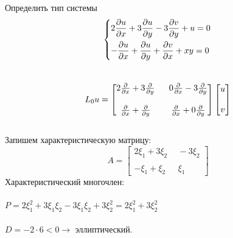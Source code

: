 \documentclass[../main.tex]{subfiles}
\begin{document}
\begin{example}
	Определить тип системы
	$$
		\begin{dcases}
			2\frac{\partial u}{\partial x} + 3\frac{\partial u}{\partial y}-3\frac{\partial v}{\partial y}+u=0 \\
			-\frac{\partial u}{\partial x} + \frac{\partial u}{\partial y}+\frac{\partial v}{\partial x}+xy=0
		\end{dcases} \\
	$$ \\
	$$L_{0}u = \begin{bmatrix}
			2\pderiv{}{x}+3\pderiv{}{y} \  & \ 0\pderiv{}{x}-3\pderiv{}{y}  \\\\
			\pderiv{}{x}+\pderiv{}{y}\     & \ \pderiv{}{x} + 0\pderiv{}{y}
		\end{bmatrix}\begin{bmatrix}
			u \\\\ v
		\end{bmatrix}$$ \\
	Запишем характеристическую матрицу:
	$$A = \begin{bmatrix}
			2\xi_1+3\xi_2 \   & \ -3\xi_2 \\ \\
			-\xi_1 + \xi_2 \  & \ \xi_1
		\end{bmatrix}$$
	Характеристический многочлен:\\ \\
	$P = 2\xi_1^2 + 3\xi_1\xi_2-3\xi_1\xi_2+3\xi_2^2=2\xi_1^2+3\xi_2^2$ \\ \\
	$D = -2\cdot6<0\rightarrow $ эллиптический.
\end{example}
\end{document}
